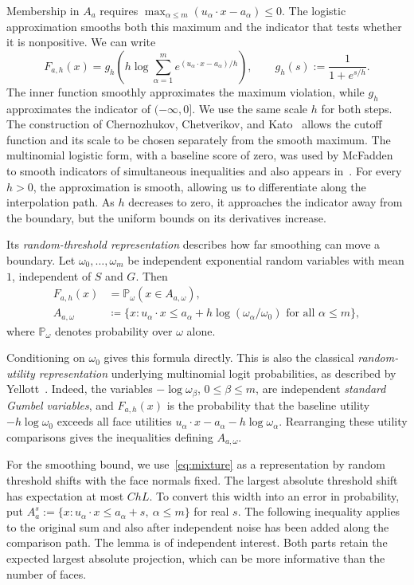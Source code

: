 \documentclass[11pt,letterpaper]{article}
\theoremstyle{remark}
\newcommand{\Pp}{\mathbb P}
\begin{document}
Membership in \(A_a\) requires
\(\max_{\alpha\le m}(u_\alpha\cdot x-a_\alpha)\le0\).
The logistic approximation smooths both this maximum and the indicator
that tests whether it is nonpositive. We can write
\[
 F_{a,h}(x)=g_h\!\left(h\log\sum_{\alpha=1}^m
 e^{(u_\alpha\cdot x-a_\alpha)/h}\right),
 \qquad g_h(s):=\frac1{1+e^{s/h}}.
\]
The inner function smoothly approximates the maximum violation, while
\(g_h\) approximates the indicator of \(({-\infty},0]\). We use the
same scale \(h\) for both steps. The construction of Chernozhukov,
Chetverikov, and Kato~\cite{CCK2013} allows the cutoff function and
its scale to be chosen separately from the smooth maximum. The
multinomial logistic form, with a baseline score of zero, was used by
McFadden~\cite[p.~1001]{McFadden1989} to smooth indicators of simultaneous
inequalities and also appears in~\cite[eq.~(5)]{GaoZhang}.
For every \(h>0\), the approximation is smooth, allowing us to
differentiate along the interpolation path. As \(h\) decreases to
zero, it approaches the indicator away from the boundary, but the
uniform bounds on its derivatives increase.

Its \emph{random-threshold representation} describes how far smoothing
can move a boundary. Let \(\omega_0,\ldots,\omega_m\) be independent
exponential random variables with mean \(1\), independent of \(S\) and
\(G\). Then
\begin{equation}
 \begin{split}
 F_{a,h}(x)&=\Pp_\omega(x\in A_{a,\omega}),\\
 A_{a,\omega}&\coloneqq\{x:u_\alpha\cdot x\le
 a_\alpha+h\log(\omega_\alpha/\omega_0)
                   \text{ for all }\alpha\le m\},
 \end{split}
 \label{eq:mixture}
\end{equation}
where $\Pp_\omega$ denotes probability over $\omega$ alone. 

Conditioning on \(\omega_0\) gives this formula directly. This is also
the classical \emph{random-utility representation} underlying
multinomial logit probabilities, as described by
Yellott~\cite[Section~2.6]{Yellott1977}. Indeed, the variables
\(-\log\omega_\beta\), \(0\le\beta\le m\), are independent
\emph{standard Gumbel variables}, and \(F_{a,h}(x)\) is the probability
that the baseline utility \(-h\log\omega_0\) exceeds all face utilities
\(u_\alpha\cdot x-a_\alpha-h\log\omega_\alpha\).
Rearranging these utility comparisons gives the inequalities defining
\(A_{a,\omega}\).

For the smoothing bound, we use~\eqref{eq:mixture} as a representation
by random threshold shifts with the face normals fixed.
The largest absolute threshold shift has expectation at most \(ChL\).
To convert this width into an error in probability, put
\(A_a^s:=\{x:u_\alpha\cdot x\le a_\alpha+s,\ \alpha\le m\}\) for
real \(s\). The following inequality applies to the original sum and
also after independent noise has been added along the comparison path.
The lemma is of independent interest. Both parts retain the expected
largest absolute projection, which can be more informative than the
number of faces.
\end{document}
